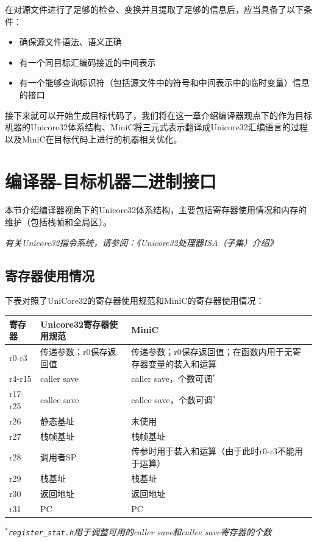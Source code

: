 在对源文件进行了足够的检查、变换并且提取了足够的信息后，应当具备了以下条件：
\begin{itemize}
	\item 确保源文件语法、语义正确
	\item 有一个同目标汇编码接近的中间表示
	\item 有一个能够查询标识符（包括源文件中的符号和中间表示中的临时变量）信息的接口
\end{itemize}
接下来就可以开始生成目标代码了，我们将在这一章介绍编译器观点下的作为目标机器的Unicore32体系结构、MiniC将三元式表示翻译成Unicore32汇编语言的过程以及MiniC在目标代码上进行的机器相关优化。
\section{编译器-目标机器二进制接口}
\label{target_machine}
本节介绍编译器视角下的Unicore32体系结构，主要包括寄存器使用情况和内存的维护（包括栈帧和全局区）。

{\it \anchor 有关Unicore32指令系统，请参阅：《Unicore32处理器ISA（子集）介绍》}\\

\subsection{寄存器使用情况}
下表对照了UniCore32的寄存器使用规范和MiniC的寄存器使用情况：
\begin{center}
	\begin{tabular}{|l|l|l|}
	\hline
		寄存器 & Unicore32寄存器使用规范 & MiniC \\
	\hline
		r0-r3 & 传递参数；r0保存返回值 & 传递参数；r0保存返回值；在函数内用于无寄存器变量的装入和运算 \\
	\hline
		r4-r15 & caller save & caller save，个数可调$^*$\\
	\hline
		r17-r25 & callee save & callee save，个数可调$^*$\\
	\hline
		r26 & 静态基址 & 未使用\\
	\hline
		r27 & 栈帧基址 & 栈帧基址\\
	\hline  
		r28 & 调用者SP & 传参时用于装入和运算（由于此时r0-r3不能用于运算）\\
	\hline 
		r29 & 栈基址 & 栈基址 \\
	\hline
		r30 & 返回地址 & 返回地址 \\
	\hline 
		r31 & PC & PC \\
	\hline
	\end{tabular}
	\label{registerstat}
\end{center}
{\it $^*$\verb|register_stat.h|用于调整可用的caller save和callee save寄存器的个数}

